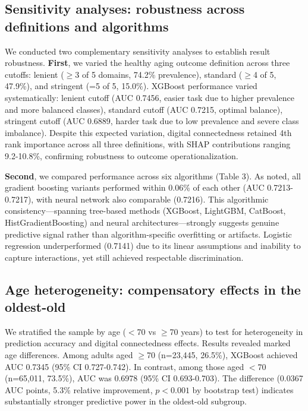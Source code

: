 \documentclass[10pt]{article}
\begin{document}
\subsection*{Sensitivity analyses: robustness across definitions and algorithms}

We conducted two complementary sensitivity analyses to establish result robustness. \textbf{First}, we varied the healthy aging outcome definition across three cutoffs: lenient ($\geq$3 of 5 domains, 74.2\% prevalence), standard ($\geq$4 of 5, 47.9\%), and stringent (=5 of 5, 15.0\%). XGBoost performance varied systematically: lenient cutoff (AUC 0.7456, easier task due to higher prevalence and more balanced classes), standard cutoff (AUC 0.7215, optimal balance), stringent cutoff (AUC 0.6889, harder task due to low prevalence and severe class imbalance). Despite this expected variation, digital connectedness retained 4th rank importance across all three definitions, with SHAP contributions ranging 9.2-10.8\%, confirming robustness to outcome operationalization.

\textbf{Second}, we compared performance across six algorithms (Table 3). As noted, all gradient boosting variants performed within 0.06\% of each other (AUC 0.7213-0.7217), with neural network also comparable (0.7216). This algorithmic consistency---spanning tree-based methods (XGBoost, LightGBM, CatBoost, HistGradientBoosting) and neural architectures---strongly suggests genuine predictive signal rather than algorithm-specific overfitting or artifacts. Logistic regression underperformed (0.7141) due to its linear assumptions and inability to capture interactions, yet still achieved respectable discrimination.

\subsection*{Age heterogeneity: compensatory effects in the oldest-old}

We stratified the sample by age ($<$70 vs $\geq$70 years) to test for heterogeneity in prediction accuracy and digital connectedness effects. Results revealed marked age differences. Among adults aged $\geq$70 (n=23,445, 26.5\%), XGBoost achieved AUC 0.7345 (95\% CI 0.727-0.742). In contrast, among those aged $<$70 (n=65,011, 73.5\%), AUC was 0.6978 (95\% CI 0.693-0.703). The difference (0.0367 AUC points, 5.3\% relative improvement, $p<0.001$ by bootstrap test) indicates substantially stronger predictive power in the oldest-old subgroup.
\end{document}
